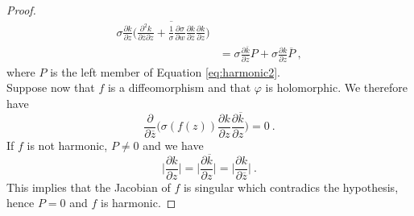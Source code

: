\begin{proof}
\[\begin{split}
        \sigma \frac{\partial k}{ \partial z} \overline{ \Big(  \frac{\partial^2 k}{\partial \overline{z} \partial z} + \frac{1}{\sigma} \frac{\partial \sigma}{\partial w} \frac{\partial k}{\partial \overline{z}} \frac{\partial k}{ \partial z}  \Big) }  \\
        & = \sigma \frac{\partial \overline{k}}{\partial \overline{z}} P + \sigma \frac{\partial k}{ \partial z} \overline{P} \ ,
    \end{split}
    \]
    where $P$ is the left member of Equation \ref{eq:harmonic2}.\\
    Suppose now that $f$ is a diffeomorphism and that $\varphi$ is holomorphic. We therefore have
    \[
    \frac{ \partial}{\partial \overline{z}}\Big(\sigma(f(z)) \frac{\partial k}{ \partial z}  \frac{\partial \overline{k}}{\partial z} \Big) = 0 \ .
    \]
    If $f$ is not harmonic, $P\neq 0$ and we have
    \[
       \Big| \frac{\partial k}{ \partial z} \Big| = \Big| \frac{\partial \overline{k}}{ \partial z} \Big| = \Big| \frac{\partial k}{ \partial \overline{z}} \Big| \ .
    \]
    This implies that the Jacobian of $f$ is singular which contradics the hypothesis, hence $P=0$ and $f$ is harmonic.
\end{proof}

